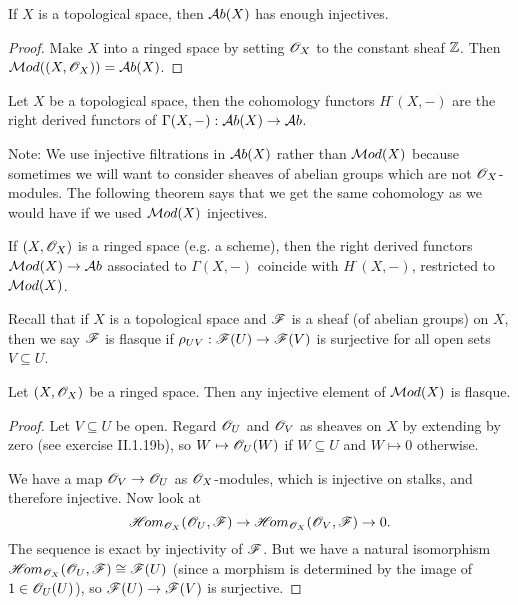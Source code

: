 \begin{corollary}
If $X$ is a topological space, then $\mathcal{A}b(X)$ has enough
injectives.
\end{corollary}
\begin{proof}
Make $X$ into a ringed space by setting $\mathscr{O}_X$ to the constant
sheaf $\mathbb{Z}$.  Then $\mathcal{M}od((X,\mathscr{O}_X))=\mathcal{A}b(X)$.
\end{proof}

\begin{definition}
Let $X$ be a topological space, then the cohomology functors
$H^{\cdot}(X,-)$ are the right derived functors of
$\Gamma(X,-):\mathcal{A}b(X)\to \mathcal{A}b$. 
\end{definition}

Note: We use injective filtrations in $\mathcal{A}b(X)$ rather than
$\mathcal{M}od(X)$ because sometimes we will want to consider sheaves of
abelian groups which are not $\mathscr{O}_X$-modules.  The following
theorem says that we get the same cohomology as we would have if
we used $\mathcal{M}od(X)$ injectives.

\begin{theorem}[*] If $(X,\mathscr{O}_X)$ is a ringed space (e.g. a
scheme), then the right derived functors $\mathcal{M}od(X)\to \mathcal{A}b$
associated to $\Gamma(X,-)$ coincide with $H^{\cdot}(X,-)$,
restricted to $\mathcal{M}od(X)$.
\end{theorem}

Recall that if $X$ is a topological space and $\mathscr{F}$ is a sheaf (of
abelian groups) on $X$, then we say $\mathscr{F}$ is flasque if
$\rho_{UV}:\mathscr{F}(U)\to \mathscr{F}(V)$ is surjective for all open sets
$V\subseteq U$.

\begin{lemma}
Let $(X,\mathscr{O}_X)$ be a ringed space.  Then any injective element of
$\mathcal{M}od(X)$ is flasque. 
\end{lemma}
\begin{proof}
Let $V\subseteq U$ be open.  Regard $\mathscr{O}_U$ and $\mathscr{O}_V$ as sheaves
on $X$ by extending by zero (see exercise II.1.19b), so $W\mapsto
\mathscr{O}_U(W)$ if $W\subseteq U$ and $W\mapsto 0$ otherwise.

We have a map $\mathscr{O}_V\to \mathscr{O}_U$ as $\mathscr{O}_X$-modules, which is injective
on stalks, and therefore injective.  Now look at
\[
 \mathscr{H}\!om_{\mathscr{O}_X}(\mathscr{O}_U,\mathscr{F}) \to \mathscr{H}\!om_{\mathscr{O}_X}(\mathscr{O}_V,\mathscr{F}) \to 0.
\]
The sequence is exact by injectivity of $\mathscr{F}$.  But we have a
natural isomorphism $\mathscr{H}\!om_{\mathscr{O}_X}(\mathscr{O}_U,\mathscr{F})\cong \mathscr{F}(U)$ (since a
morphism is determined by the image of $1\in \mathscr{O}_U(U)$), so
$\mathscr{F}(U)\to \mathscr{F}(V)$ is surjective.
\end{proof}


